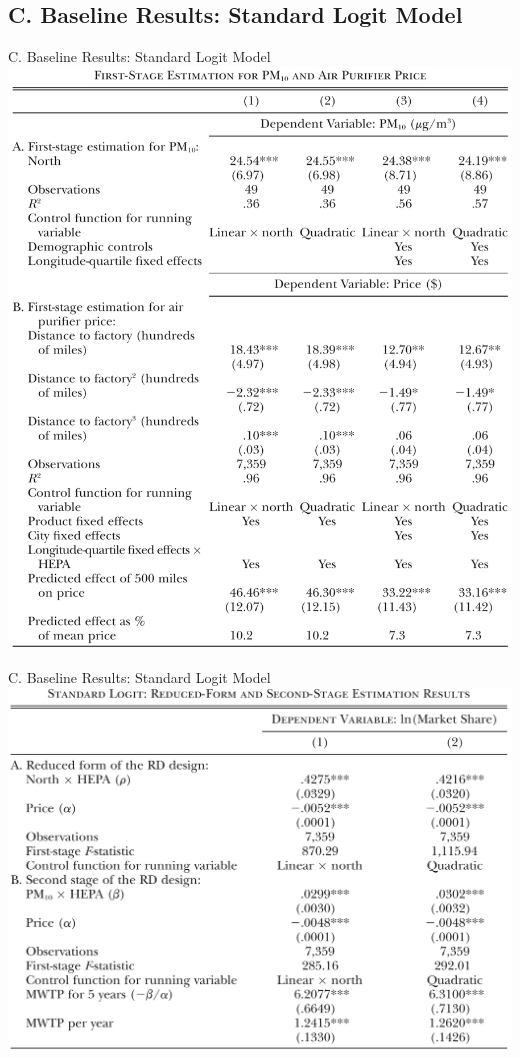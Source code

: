 \documentclass{beamer}
\begin{document}
\subsection{C. Baseline Results: Standard Logit Model}
\begin{frame}[shrink]
	\transfade
	\tableofcontents[sectionstyle=show/shaded,subsectionstyle=show/shaded/hide]
	\addtocounter{framenumber}{-1}
\end{frame}
\begin{frame}{C. Baseline Results: Standard Logit Model}
	\centering
	\includegraphics[scale=0.35]{table3.png}
\end{frame}
\begin{frame}{C. Baseline Results: Standard Logit Model}
	\centering
	\includegraphics[scale=0.35]{table4.png}
\end{frame}
\end{document}
